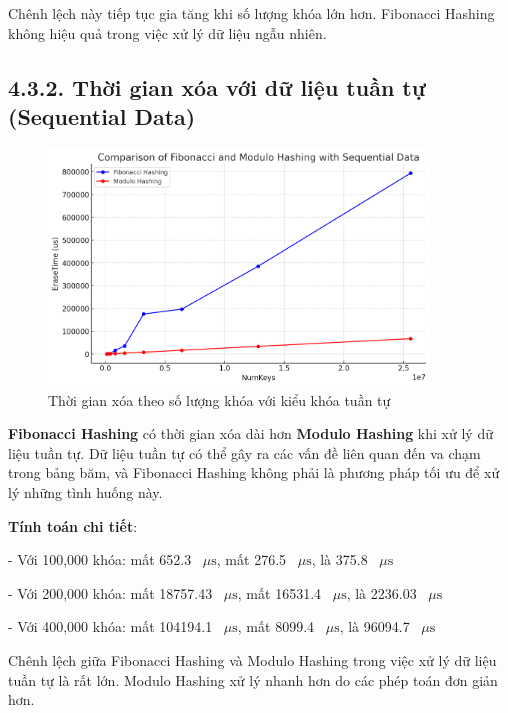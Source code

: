 \documentclass[12pt,a4paper]{report}
\begin{document}
Chênh lệch này tiếp tục gia tăng khi số lượng khóa lớn hơn. Fibonacci Hashing không hiệu quả trong việc xử lý dữ liệu ngẫu nhiên.

\subsection*{4.3.2. Thời gian xóa với dữ liệu tuần tự (Sequential Data)}
\begin{figure}[!ht]
    \centering
    \includegraphics[width=0.9\textwidth]{del_seq.png}
    \caption{Thời gian xóa theo số lượng khóa với kiểu khóa tuần tự}
    \label{fig:del_seq}
\end{figure}

\noindent \indent \textbf{Fibonacci Hashing} có thời gian xóa dài hơn \textbf{Modulo Hashing} khi xử lý dữ liệu tuần tự. Dữ liệu tuần tự có thể gây ra các vấn đề liên quan đến va chạm trong bảng băm, và Fibonacci Hashing không phải là phương pháp tối ưu để xử lý những tình huống này.

\textbf{Tính toán chi tiết}:

  - Với 100,000 khóa:
   mất 652.3 \, $\mu\text{s}$,  mất 276.5 \, $\mu\text{s}$,  là 375.8 \, $\mu\text{s}$
  
  - Với 200,000 khóa:
   mất 18757.43 \, $\mu\text{s}$,  mất 16531.4 \, $\mu\text{s}$,    là 2236.03 \, $\mu\text{s}$
  
- Với 400,000 khóa:
   mất 104194.1 \, $\mu\text{s}$,  mất 8099.4 \, $\mu\text{s}$,   là 96094.7 \, $\mu\text{s}$

Chênh lệch giữa Fibonacci Hashing và Modulo Hashing trong việc xử lý dữ liệu tuần tự là rất lớn. Modulo Hashing xử lý nhanh hơn do các phép toán đơn giản hơn.
\end{document}
